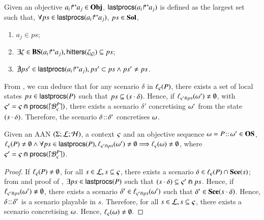 \begin{definition}[$\lastprocs : \Obj\to\Sol$]
\label{def:lastprocs}
  Given an objective ${a_i\!\Rsh^*\!\!a_j} \in \mathbf{Obj}$, $\mathsf{lastprocs}({a_i\!\Rsh^*\!\!a_j})$ is
  defined as the largest set such that, $\forall ps\in\mathsf{lastprocs}({a_i\!\Rsh^*\!\!a_j})$, 
  $ps\in\mathbf{Sol}$,
  \begin{enumerate}
    \item $a_j \in ps$;
    \item $\exists \zeta \in \mathbf{BS}({a_i\!\Rsh^*\!\!a_j}),
      \mathsf{hitters}(\zeta_{|\zeta|}) \subseteq ps$;
    \item $\nexists ps' \in \mathsf{lastprocs}({a_i\!\Rsh^*\!\!a_j}),
      ps' \subset ps \wedge ps' \neq ps$.
  \end{enumerate}
\end{definition}

From , we can deduce that
for any scenario $\delta$ in $\ell_\varsigma(P)$,
there exists a set of local states $ps\in\mathsf{lastprocs}(P)$
such that $ps \subseteq (s\cdot\delta)$.
Hence, if $\ell_{\varsigma'\Cap ps}(\omega')\neq\emptyset$,
with $\varsigma'=\varsigma\Cap\mathsf{procs}(\lceil \mathcal{B}_{\varsigma}^{P}\rceil)$,
there exists a scenario $\delta'$ concretising $\omega'$ from the
state $(s\cdot\delta)$.
Therefore, the scenario $\delta\!::\!\delta'$ concretises
$\omega$.

\begin{theorem}
\label{thm:ordered-ua}
Given an AAN $(\Sigma; \mathcal{L}; \mathcal{H})$,
a context $\varsigma$ and an objective sequence $\omega =
P\!::\!\omega'\in\mathbf{OS}$,
$\ell_\varsigma(P)\neq\emptyset \wedge
	\forall ps \in\mathsf{lastprocs}(P),
	\ell_{\varsigma'\Cap ps}(\omega')\neq\emptyset
	\Longrightarrow \ell_\varsigma(\omega)\neq\emptyset$,
where $\varsigma' = \varsigma\Cap\mathsf{procs}(\lceil \mathcal{B}_{\varsigma}^{P}\rceil)$.
\end{theorem}
\begin{proof}
If $\ell_\varsigma(P)\neq\emptyset$,
for all $s\in \mathcal{L}, s\subseteq\varsigma$,
there exists a scenario $\delta\in\ell_\varsigma(P)\cap\mathbf{Sce}(s)$;
from  and proof of ,
$\exists ps\in\mathsf{lastprocs}(P)$ such that
$(s\cdot\delta)\subseteq\varsigma'\Cap ps$.
Hence, if $\ell_{\varsigma'\Cap ps}(\omega')\neq\emptyset$,
there exists a scenario $\delta'\in\ell_{\varsigma'\Cap ps}(\omega')$ such that
$\delta'\in\mathbf{Sce}(s\cdot\delta)$.
Hence, $\delta\!::\!\delta'$ is a scenario playable in $s$.
Therefore, for all $s\in \mathcal{L}, s\subseteq\varsigma$, there exists a scenario
concretising $\omega$.
Hence, $\ell_\varsigma(\omega)\neq\emptyset$.
\end{proof}




